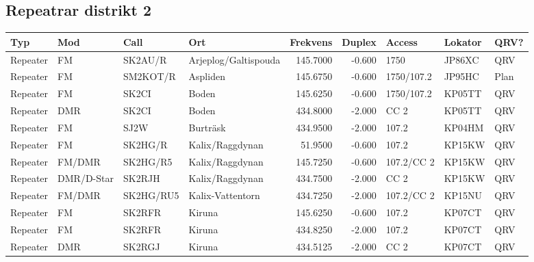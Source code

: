 \begin{landscape}
\subsection{Repeatrar distrikt 2}

\begin{longtable}{llllrrlll}
	\bf Typ  & \bf Mod            & \bf Call  & \bf Ort              & \bf Frekvens & \bf Duplex & \bf Access & \bf Lokator & \bf QRV? \\ \hline
	\endhead
	Repeater & FM                 & SK2AU/R   & Arjeplog/Galtispouda &     145.7000 &     -0.600 & 1750       & JP86XC      & QRV      \\
	Repeater & FM                 & SM2KOT/R  & Aspliden             &     145.6750 &     -0.600 & 1750/107.2 & JP95HC      & Plan     \\
	Repeater & FM                 & SK2CI     & Boden                &     145.6250 &     -0.600 & 1750/107.2 & KP05TT      & QRV      \\
	Repeater & DMR                & SK2CI     & Boden                &     434.8000 &     -2.000 & CC 2       & KP05TT      & QRV      \\
	Repeater & FM                 & SJ2W      & Burträsk             &     434.9500 &     -2.000 & 107.2      & KP04HM      & QRV      \\
	Repeater & FM                 & SK2HG/R   & Kalix/Raggdynan      &      51.9500 &     -0.600 & 107.2      & KP15KW      & QRV      \\
	Repeater & FM/DMR             & SK2HG/R5  & Kalix/Raggdynan      &     145.7250 &     -0.600 & 107.2/CC 2 & KP15KW      & QRV      \\
	Repeater & DMR/D-Star         & SK2RJH    & Kalix/Raggdynan      &     434.7500 &     -2.000 & CC 2       & KP15KW      & QRV      \\
	Repeater & FM/DMR             & SK2HG/RU5 & Kalix-Vattentorn     &     434.7250 &     -2.000 & 107.2/CC 2 & KP15NU      & QRV      \\
	Repeater & FM                 & SK2RFR    & Kiruna               &     145.6250 &     -0.600 & 107.2      & KP07CT      & QRV      \\
	Repeater & FM                 & SK2RFR    & Kiruna               &     434.8250 &     -2.000 & 107.2      & KP07CT      & QRV      \\
	Repeater & DMR                & SK2RGJ    & Kiruna               &     434.5125 &     -2.000 & CC 2       & KP07CT      & QRV      \\

\end{longtable}
\end{landscape}
